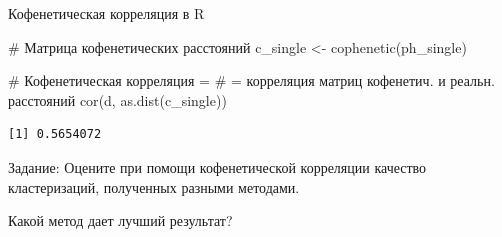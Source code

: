 \documentclass[
  ignorenonframetext,
  russian,
]{beamer}
\newenvironment{Shaded}{\begin{snugshade}}{\end{snugshade}}
\newcommand{\CommentTok}[1]{\textcolor[rgb]{0.37,0.37,0.37}{#1}}
\newcommand{\FunctionTok}[1]{\textcolor[rgb]{0.28,0.35,0.67}{#1}}
\newcommand{\NormalTok}[1]{\textcolor[rgb]{0.00,0.23,0.31}{#1}}
\newcommand{\OtherTok}[1]{\textcolor[rgb]{0.00,0.23,0.31}{#1}}
\begin{document}
\begin{frame}[fragile]{Кофенетическая корреляция в R}
\protect{}\label{ux43aux43eux444ux435ux43dux435ux442ux438ux447ux435ux441ux43aux430ux44f-ux43aux43eux440ux440ux435ux43bux44fux446ux438ux44f-ux432-r}
\scriptsize

\begin{Shaded}
\begin{Highlighting}[]
\CommentTok{\# Матрица кофенетических расстояний }
\NormalTok{c\_single }\OtherTok{\textless{}{-}} \FunctionTok{cophenetic}\NormalTok{(ph\_single)}

\CommentTok{\# Кофенетическая корреляция = }
\CommentTok{\# = корреляция матриц кофенетич. и реальн. расстояний}
\FunctionTok{cor}\NormalTok{(d, }\FunctionTok{as.dist}\NormalTok{(c\_single))}
\end{Highlighting}
\end{Shaded}

\begin{verbatim}
[1] 0.5654072
\end{verbatim}
\end{frame}

\begin{frame}{Задание:}
\protect{}\label{ux437ux430ux434ux430ux43dux438ux435-1}
Оцените при помощи кофенетической корреляции качество кластеризаций,
полученных разными методами.

Какой метод дает лучший результат?
\end{frame}
\end{document}
